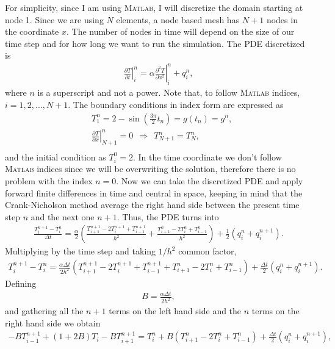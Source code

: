 For simplicity, since I am using \textsc{Matlab}, I will discretize the domain starting at node 1. Since we are using $N$ elements, a node based mesh has $N+1$ nodes in the coordinate $x$. The number of nodes in time will depend on the size of our time step and for how long we want to run the simulation. The PDE discretized is
\begin{align*}
\left.\frac{\partial T}{\partial t}\right|_i^n=\alpha\left.\frac{\partial^2 T}{\partial x^2}\right|_i^n+q_i^n,
\end{align*}
where $n$ is a superscript and not a power. Note that, to follow \textsc{Matlab} indices, $i=1,2,...,N+1$. The boundary conditions in index form are expressed as
\begin{align*}
&T_1^n=2-\sin\left(\frac{3\pi}{2}t_n\right)=g(t_n)=g^n,\\
&\left.\frac{\partial T}{\partial x}\right|_{N+1}^n=0~~\Rightarrow~~T_{N+1}^n=T_{N}^n,\\
\end{align*}
and the initial condition as $T_i^0=2$. In the time coordinate we don't follow \textsc{Matlab} indices since we will be overwriting the solution, therefore there is no problem with the index $n=0$. Now we can take the discretized PDE and apply forward finite differences in time and central in space, keeping in mind that the Crank-Nicholson method average the right hand side between the present time step $n$ and the next one $n+1$. Thus, the PDE turns into
\begin{align*}
\frac{T_i^{n+1}-T_i^n}{\Delta t}=\frac{\alpha}{2}\left(\frac{T_{i+1}^{n+1}-2T_{i}^{n+1}+T_{i-1}^{n+1}}{h^2}+\frac{T_{i+1}^{n}-2T_{i}^{n}+T_{i-1}^{n}}{h^2}\right)+\frac{1}{2}\left(q_i^n+q_i^{n+1}\right).
\end{align*}
Multiplying by the time step and taking $1/h^2$ common factor,
\begin{align*}
T_i^{n+1}-T_i^n=\frac{\alpha\Delta t}{2h^2}\left(T_{i+1}^{n+1}-2T_{i}^{n+1}+T_{i-1}^{n+1}+T_{i+1}^{n}-2T_{i}^{n}+T_{i-1}^{n}\right)+\frac{\Delta t}{2}\left(q_i^n+q_i^{n+1}\right).
\end{align*}
Defining 
\begin{align*}
B=\frac{\alpha\Delta t}{2h^2},
\end{align*}
and gathering all the $n+1$ terms on the left hand side and the $n$ terms on the right hand side we obtain
\begin{align*}
-BT_{i-1}^{n+1}+(1+2B)T_i-BT_{i+1}^{n+1}=T_i^n+B\left(T_{i+1}^n-2T_{i}^n+T_{i-1}^n\right)+\frac{\Delta t}{2}\left(q_i^n+q_i^{n+1}\right),
\end{align*}
